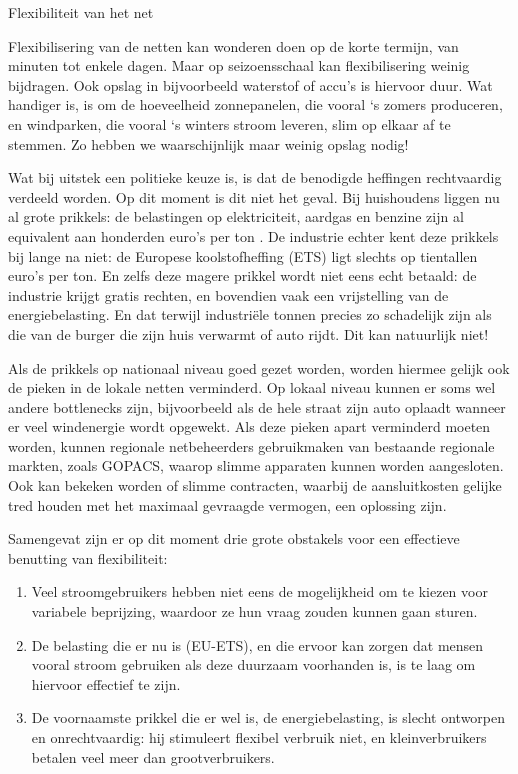 \begin{voorstel}{Flexibiliteit van het net}
\begin{overwegingen}
\begin{infobox}{}
Flexibilisering van de netten kan wonderen doen op de korte termijn, van minuten tot enkele dagen. Maar op seizoensschaal kan flexibilisering weinig bijdragen. Ook opslag in bijvoorbeeld waterstof of accu’s is hiervoor duur. Wat handiger is, is om de hoeveelheid zonnepanelen, die vooral ‘s zomers produceren, en windparken, die vooral ‘s winters stroom leveren, slim op elkaar af te stemmen. Zo hebben we waarschijnlijk maar weinig opslag nodig!
\end{infobox}

Wat bij uitstek een politieke keuze is, is dat de benodigde heffingen rechtvaardig verdeeld worden. Op dit moment is dit niet het geval. Bij huishoudens liggen nu al grote prikkels: de belastingen op elektriciteit, aardgas en benzine zijn al equivalent aan honderden euro’s per ton \COO. De industrie echter kent deze prikkels bij lange na niet: de Europese koolstofheffing (ETS) ligt slechts op tientallen euro’s per ton. En zelfs deze magere prikkel wordt niet eens echt betaald: de industrie krijgt gratis rechten, en bovendien vaak een vrijstelling van de energiebelasting. En dat terwijl industriële tonnen \COO precies zo schadelijk zijn als die van de burger die zijn huis verwarmt of auto rijdt. Dit kan natuurlijk niet!

\begin{infobox}{}
Als de prikkels op nationaal niveau goed gezet worden, worden hiermee gelijk ook de pieken in de lokale netten verminderd. Op lokaal niveau kunnen er soms wel andere bottlenecks zijn, bijvoorbeeld als de hele straat zijn auto oplaadt wanneer er veel windenergie wordt opgewekt. Als deze pieken apart verminderd moeten worden, kunnen regionale netbeheerders gebruikmaken van bestaande regionale markten, zoals GOPACS, waarop slimme apparaten kunnen worden aangesloten. Ook kan bekeken worden of slimme contracten, waarbij de aansluitkosten gelijke tred houden met het maximaal gevraagde vermogen, een oplossing zijn.
\end{infobox}

Samengevat zijn er op dit moment drie grote obstakels voor een effectieve benutting van flexibiliteit:
\begin{enumerate}
	\item Veel stroomgebruikers hebben niet eens de mogelijkheid om te kiezen voor variabele beprijzing, waardoor ze hun vraag zouden kunnen gaan sturen.
	\item De \COO belasting die er nu is (EU-ETS), en die ervoor kan zorgen dat mensen vooral stroom gebruiken als deze duurzaam voorhanden is, is te laag om hiervoor effectief te zijn.
	\item De voornaamste prikkel die er wel is, de energiebelasting, is slecht ontworpen en onrechtvaardig: hij stimuleert flexibel verbruik niet, en kleinverbruikers betalen veel meer dan grootverbruikers.
\end{enumerate}


\end{overwegingen}
\end{voorstel}

